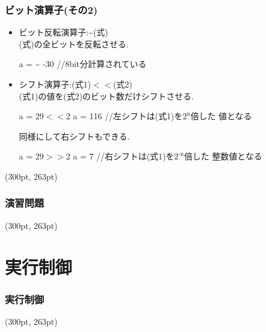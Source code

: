 \documentclass[dvipdfmx]{beamer}
\begin{document}
\begin{frame}[t, fragile]
    \frametitle{ビット演算子(その2)}
    \begin{itemize}
        \item ビット反転演算子:\~\space (式)\\
            \qquad (式)の全ビットを反転させる.
            \begin{block}{a = \~}
                -30 \qquad //8bit分計算されている
            \end{block}
        \item シフト演算子:(式1)$<<$(式2)\\
            \qquad (式1)の値を(式2)のビット数だけシフトさせる. 
            \begin{block}{a = 29$<<$2}
                a = 116 \qquad //左シフトは(式1)を$2^{\textrm{n}}$倍した
                値となる
            \end{block}
            \qquad 同様にして右シフトもできる.
            \begin{block}{a = 29$>>$2}
                a = 7 \qquad //右シフトは(式1)を$2^{\textrm{-n}}$倍した
                整数値となる
            \end{block}
    \end{itemize}
    \begin{textblock*}{0.3\linewidth}(300pt, 263pt)
    \space
    \end{textblock*}
\end{frame}

\begin{frame}[t,fragile]
    \frametitle{演習問題}
    \begin{textblock*}{0.3\linewidth}(300pt, 263pt)
    \space
    \end{textblock*}
\end{frame}

\section{実行制御}
\begin{frame}[t, fragile]
    \frametitle{実行制御}
    \tableofcontents[sections={2,7}]
    \begin{textblock*}{0.3\linewidth}(300pt, 263pt)
    \space
    \end{textblock*}
\end{frame}
\end{document}
